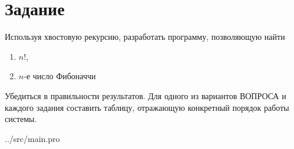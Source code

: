 \section*{Задание}

Используя хвостовую рекурсию, разработать программу, позволяющую найти
\begin{enumerate}
	\item $n!$,
	\item $n$-е число Фибоначчи
\end{enumerate}
Убедиться в правильности результатов.
Для одного из вариантов ВОПРОСА и каждого задания составить таблицу, отражающую конкретный порядок работы системы.

\begin{lstinputlisting}[
	label={lst:t1},
	]{../src/main.pro}
\end{lstinputlisting}

